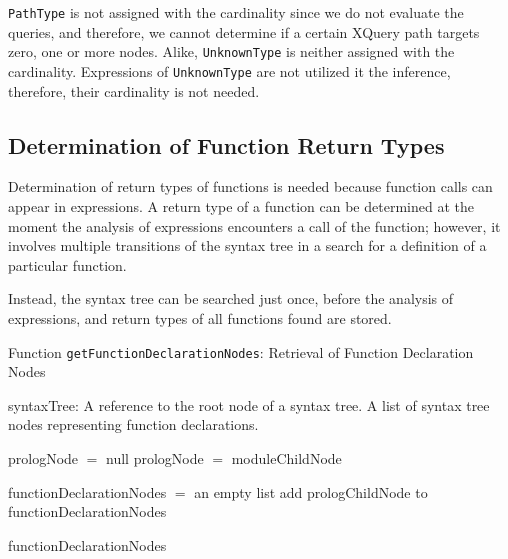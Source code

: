 \texttt{PathType} is not assigned with the cardinality since we do not evaluate the queries, and therefore, we cannot determine if a certain XQuery path targets zero, one or more nodes. Alike, \texttt{UnknownType} is neither assigned with the cardinality. Expressions of \texttt{UnknownType} are not utilized it the inference, therefore, their cardinality is not needed.


\subsection{Determination of Function Return Types}
Determination of return types of functions is needed because function calls can appear in expressions. A return type of a function can be determined at the moment the analysis of expressions encounters a call of the function; however, it involves multiple transitions of the syntax tree in a search for a definition of a particular function.

Instead, the syntax tree can be searched just once, before the analysis of expressions, and return types of all functions found are stored.

\begin{algorithm}
\caption{Function \texttt{getFunctionDeclarationNodes}: Retrieval of Function Declaration Nodes}
\label{ALG_retrieval_of_function_declaration_nodes}
\begin{algorithmic}[1]
\REQUIRE syntaxTree: A reference to the root node of a syntax tree.
\ENSURE A list of syntax tree nodes representing function declarations.

\STATE prologNode $=$ null
        \STATE prologNode $=$ moduleChildNode
    \ENDIF
\ENDFOR

\STATE functionDeclarationNodes $=$ an empty list
            \STATE add prologChildNode to functionDeclarationNodes
        \ENDIF
    \ENDFOR
\ENDIF

\RETURN functionDeclarationNodes
\end{algorithmic}
\end{algorithm}


